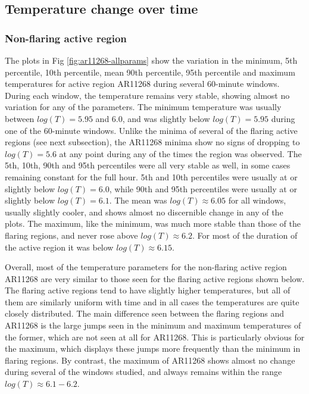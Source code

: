 \documentclass[namedreferences]{solarphysics}
\begin{document}
\begin{article}
\subsection{Temperature change over time}
\subsubsection{Non-flaring active region}
The plots in Fig \ref{fig:ar11268-allparams} show the variation in the minimum, 5th percentile, 10th percentile, mean 90th percentile, 95th percentile and maximum temperatures for active region AR11268 during several 60-minute windows.
During each window, the temperature remains very stable, showing almost no variation for any of the parameters.
The minimum temperature was usually between $log(T)=5.95$ and $6.0$, and was slightly below $log(T)=5.95$ during one of the 60-minute windows.
Unlike the minima of several of the flaring active regions (see next subsection), the AR11268 minima show no signs of dropping to $log(T)=5.6$ at any point during any of the times the region was observed.
The 5th, 10th, 90th and 95th percentiles were all very stable as well, in some cases remaining constant for the full hour.
5th and 10th percentiles were usually at or slightly below $log(T)=6.0$, while 90th and 95th percentiles were usually at or slightly below $log(T)=6.1$.
The mean was $log(T)\approx6.05$ for all windows, usually slightly cooler, and shows almost no discernible change in any of the plots.
The maximum, like the minimum, was much more stable than those of the flaring regions, and never rose above $log(T)\approx6.2$.
For most of the duration of the active region it was below $log(T)\approx6.15$.

Overall, most of the temperature parameters for the non-flaring active region AR11268 are very similar to those seen for the flaring active regions shown below.
The flaring active regions tend to have slightly higher temperatures, but all of them are similarly uniform with time and in all cases the temperatures are quite closely distributed.
The main difference seen between the flaring regions and AR11268 is the large jumps seen in the minimum and maximum temperatures of the former, which are not seen at all for AR11268.
This is particularly obvious for the maximum, which displays these jumps more frequently than the minimum in flaring regions.
By contrast, the maximum of AR11268 shows almost no change during several of the windows studied, and always remains within the range $log(T)\approx6.1-6.2$. 


\end{article}
\end{document}
